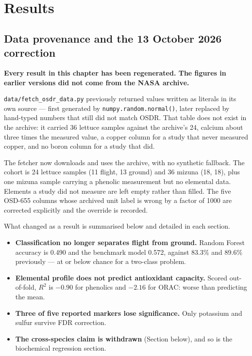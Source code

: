 \chapter{Results}
\label{ch:results}

\section{Data provenance and the 13 October 2026 correction}
\label{sec:data-correction}

\textbf{Every result in this chapter has been regenerated. The figures in
earlier versions did not come from the NASA archive.}

\texttt{data/fetch\_osdr\_data.py} previously returned values written as literals
in its own source --- first generated by \texttt{numpy.random.normal()}, later
replaced by hand-typed numbers that still did not match OSDR. That table does
not exist in the archive: it carried 36 lettuce samples against the archive's
24, calcium about three times the measured value, a copper column for a study
that never measured copper, and no boron column for a study that did.

The fetcher now downloads and uses the archive, with no synthetic fallback. The
cohort is 24 lettuce samples (11 flight, 13 ground) and 36 mizuna (18,
18), plus one mizuna sample carrying a phenolic measurement but no
elemental data. Elements a study did not measure are left empty rather than
filled. The five OSD-655 columns whose archived unit label is wrong by a factor
of 1000 are corrected explicitly and the override is recorded.

What changed as a result is summarised below and detailed in each section.

\begin{itemize}
    \item \textbf{Classification no longer separates flight from ground.}
          Random Forest accuracy is 0.490 and the benchmark model 0.572, against
          83.3\% and 89.6\% previously --- at or below chance for a two-class
          problem.
    \item \textbf{Elemental profile does not predict antioxidant capacity.}
          Scored out-of-fold, $R^2$ is $-0.90$ for phenolics and $-2.16$ for
          ORAC: worse than predicting the mean.
    \item \textbf{Three of five reported markers lose significance.} Only
          potassium and sulfur survive FDR correction.
    \item \textbf{The cross-species claim is withdrawn} (Section below), and so
          is the biochemical regression section.
\end{itemize}

